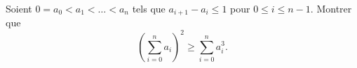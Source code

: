 Soient $0 = a_0 < a_1 < \ldots < a_n$ tels que $a_{i+1} - a_i \leq 1$ pour $0 \leq i \leq n - 1$. Montrer que
\[ \left(\sum_{i=0}^n a_i\right)^2 \geq \sum_{i=0}^n a_i^3. \]

